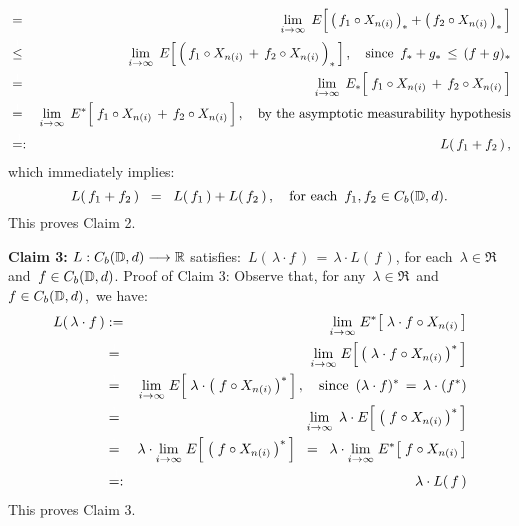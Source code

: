 \begin{eqnarray*}
\\
& \overset{{\color{white}1}}{=} &
	\underset{i\rightarrow\infty}{\lim}\;\,
	E\!\left[\,
		\left(\,f_{1} \circ X_{n(i)}\,\right)_{*}
		\overset{{\color{white}.}}{+}
		\left(\,f_{2} \circ X_{n(i)}\,\right)_{*}
	\,\right]
\\
& \overset{{\color{white}1}}{\leq} &
	\underset{i\rightarrow\infty}{\lim}\;\,
	E\!\left[\,\left(\,f_{1} \circ X_{n(i)} \,\overset{{\color{white}.}}{+}\, f_{2} \circ X_{n(i)} \,\right)_{*} \,\right],
	\quad
	\textnormal{since \,$f_{*} +  g_{*} \,\leq\, (f + g)_{*}$}
\\
& \overset{{\color{white}1}}{=} &
	\underset{i\rightarrow\infty}{\lim}\;\,
	E_{*}\!\left[\;f_{1} \circ X_{n(i)} \,\overset{{\color{white}.}}{+}\, f_{2} \circ X_{n(i)} \,\right]
\\
& \overset{{\color{white}1}}{=} &
	\underset{i\rightarrow\infty}{\lim}\;\,
	E^{*}\!\left[\;f_{1} \circ X_{n(i)} \,\overset{{\color{white}.}}{+}\, f_{2} \circ X_{n(i)} \,\right],
	\quad\textnormal{by the asymptotic measurability hypothesis}
\\
& \overset{{\color{white}1}}{=:} &
	L(\,f_{1} + f_{2}\,)\,,
\end{eqnarray*}
which immediately implies:
\begin{equation*}
L(\,f_{1} + f_{2}\,) \;\; = \;\; L(\,f_{1}\,) + L(\,f_{2}\,)\,,
\quad
\textnormal{for each \,$f_{1}, f_{2} \in C_{b}(\mathbb{D},d)$}.
\end{equation*}
This proves Claim 2.

\vskip 0.5cm
\noindent
\textbf{Claim 3:}\;\;
$L : C_{b}(\mathbb{D},d) \longrightarrow \mathbb{R}$ satisfies:\,
$L(\,\lambda\cdot f\,) \,=\, \lambda \cdot L(\,f\,)$,\;
for each \,$\lambda \in \Re$\, and \,$f \in C_{b}(\mathbb{D},d)$.
\vskip 0.2cm
\noindent
Proof of Claim 3:\;\;
Observe that, for any \,$\lambda \in \Re$\, and \,$f \in C_{b}(\mathbb{D},d)$,\, we have:
\begin{eqnarray*}
L(\,\lambda \cdot f\,)
&:=&
	\underset{i\rightarrow\infty}{\lim}\;
	E^{*}\!\left[\; \lambda \cdot f \circ X_{n(i)} \,\right]
\\
& \overset{{\color{white}1}}{=} &
	\underset{i\rightarrow\infty}{\lim}\;
	E\!\left[\,\left(\; \lambda \cdot f \circ X_{n(i)} \,\right)^{*}\,\right]
\\
& \overset{{\color{white}1}}{=} &
	\underset{i\rightarrow\infty}{\lim}\;
	E\!\left[\; \lambda \cdot \left(\; f \circ X_{n(i)}\,\right)^{*} \,\right],
	\quad
	\textnormal{since \,$(\lambda \cdot f)^{*} \,=\, \lambda \cdot (f^{*})$}
\\
& \overset{{\color{white}1}}{=} &
	\underset{i\rightarrow\infty}{\lim}\;\,
	\lambda \cdot E\!\left[\;\left(\; f \circ X_{n(i)}\,\right)^{*} \,\right]
\\
& \overset{{\color{white}1}}{=} &
	\lambda \cdot
	\underset{i\rightarrow\infty}{\lim}\;
	E\!\left[\;\left(\; f \circ X_{n(i)}\,\right)^{*} \,\right]
\;\; = \;\;
	\lambda \cdot
	\underset{i\rightarrow\infty}{\lim}\;
	E^{*}\!\left[\; f \circ X_{n(i)} \,\right]
\\
& \overset{{\color{white}1}}{=:} &
	\lambda \cdot L(\,f\,)
\end{eqnarray*}
This proves Claim 3.

